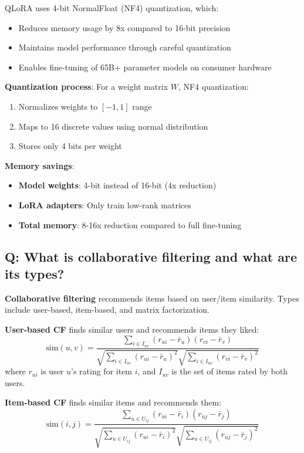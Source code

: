 QLoRA uses 4-bit NormalFloat (NF4) quantization, which:
\begin{itemize}
	\item Reduces memory usage by 8x compared to 16-bit precision
	\item Maintains model performance through careful quantization
	\item Enables fine-tuning of 65B+ parameter models on consumer hardware
\end{itemize}

\textbf{Quantization process}:
For a weight matrix \(W\), NF4 quantization:
\begin{enumerate}
	\item Normalizes weights to \([-1, 1]\) range
	\item Maps to 16 discrete values using normal distribution
	\item Stores only 4 bits per weight
\end{enumerate}

\textbf{Memory savings}:
\begin{itemize}
	\item \textbf{Model weights}: 4-bit instead of 16-bit (4x reduction)
	\item \textbf{LoRA adapters}: Only train low-rank matrices
	\item \textbf{Total memory}: 8-16x reduction compared to full fine-tuning
\end{itemize}

\subsection*{Q: What is collaborative filtering and what are its types?}
\textbf{Collaborative filtering} recommends items based on user/item similarity. Types include user-based, item-based, and matrix factorization.

\textbf{User-based CF} finds similar users and recommends items they liked:
\[
	\text{sim}(u, v) = \frac{\sum_{i \in I_{uv}} (r_{ui} - \bar{r}_u)(r_{vi} - \bar{r}_v)}{\sqrt{\sum_{i \in I_{uv}} (r_{ui} - \bar{r}_u)^2} \sqrt{\sum_{i \in I_{uv}} (r_{vi} - \bar{r}_v)^2}}
\]
where \(r_{ui}\) is user \(u\)'s rating for item \(i\), and \(I_{uv}\) is the set of items rated by both users.

\textbf{Item-based CF} finds similar items and recommends them:
\[
	\text{sim}(i, j) = \frac{\sum_{u \in U_{ij}} (r_{ui} - \bar{r}_i)(r_{uj} - \bar{r}_j)}{\sqrt{\sum_{u \in U_{ij}} (r_{ui} - \bar{r}_i)^2} \sqrt{\sum_{u \in U_{ij}} (r_{uj} - \bar{r}_j)^2}}
\]

